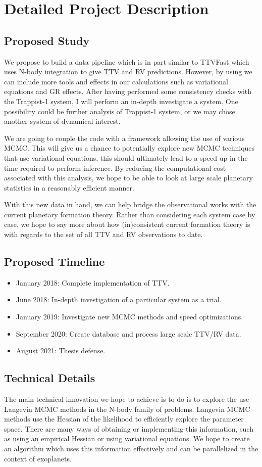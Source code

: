 \section{Detailed Project Description}
\subsection{Proposed Study}
We propose to build a data pipeline which is in part similar to TTVFast which uses N-body integration to give TTV and RV predictions. 
However, by using \reb we can include more tools and effects in our calculations such as variational equations and GR effects.
After having performed some consistency checks with the Trappist-1 system, I will perform an in-depth investigate a system.
One possibility could be further analysis of Trappist-1 system, or we may chose another system of dynamical interest.


We are going to couple the \reb code with a framework allowing the use of various MCMC.
This will give us a chance to potentially explore new MCMC techniques that use variational equations, this should ultimately lead to a speed up in the time required to perform inference.
By reducing the computational cost associated with this analysis, we hope to be able to look at large scale planetary statistics in a reasonably efficient manner.


With this new data in hand, we can help bridge the observational works with the current planetary formation theory.
Rather than considering each system case by case, we hope to say more about how (in)consistent current formation theory is with regards to the set of all TTV and RV observations to date.
\subsection{Proposed Timeline}
\begin{itemize}
	\item January 2018: Complete implementation of TTV.
	\item June 2018: In-depth investigation of a particular system as a trial.
	\item January 2019: Investigate new MCMC methods and speed optimizations.
	\item September 2020: Create database and process large scale TTV/RV data.
	\item August 2021: Thesis defense.
\end{itemize}

\subsection{Technical Details}
The main technical innovation we hope to achieve is to do is to explore the use Langevin MCMC methods in the N-body family of problems. 
Langevin MCMC methods use the Hessian of the likelihood to efficiently explore the parameter space. 
There are many ways of obtaining or implementing this information, such as using an empirical Hessian or using variational equations. 
We hope to create an algorithm which uses this information effectively and can be parallelized in the context of exoplanets.

